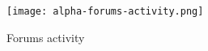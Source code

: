 \begin{figure}[htbp] 
    \centering
    \texttt{[image: alpha-forums-activity.png]} 
    \caption{Forums activity}
    \label{fig:forum-activity}  
  \end{figure}